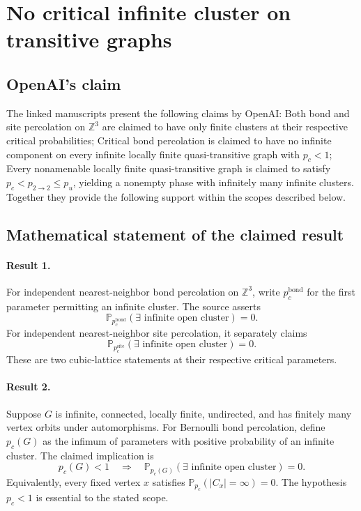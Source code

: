 \documentclass[11pt]{article}
\begin{document}
\section*{No critical infinite cluster on transitive graphs}

\subsection{OpenAI's claim}
The linked manuscripts present the following claims by OpenAI: Both bond and site percolation on $\mathbb Z^3$ are claimed to have only finite clusters at their respective critical probabilities; Critical bond percolation is claimed to have no infinite component on every infinite locally finite quasi-transitive graph with $p_c<1$; Every nonamenable locally finite quasi-transitive graph is claimed to satisfy $p_c<p_{2\to2}\leq p_u$, yielding a nonempty phase with infinitely many infinite clusters. Together they provide the following support within the scopes described below.

\subsection{Mathematical statement of the claimed result}
\paragraph{Result 1.} For independent nearest-neighbor bond percolation on \(\mathbb Z^3\), write \(p_c^{\mathrm{bond}}\) for the first parameter permitting an infinite cluster. The source asserts
\[
 \mathbb P_{p_c^{\mathrm{bond}}}(\exists\text{ infinite open cluster})=0.
\]
For independent nearest-neighbor site percolation, it separately claims
\[
 \mathbb P_{p_c^{\mathrm{site}}}(\exists\text{ infinite open cluster})=0.
\]
These are two cubic-lattice statements at their respective critical parameters.

\paragraph{Result 2.} Suppose \(G\) is infinite, connected, locally finite, undirected, and has finitely many vertex orbits under automorphisms. For Bernoulli bond percolation, define \(p_c(G)\) as the infimum of parameters with positive probability of an infinite cluster. The claimed implication is
\[
 p_c(G)<1\quad\Longrightarrow\quad
 \mathbb P_{p_c(G)}(\exists\text{ infinite open cluster})=0.
\]
Equivalently, every fixed vertex \(x\) satisfies \(\mathbb P_{p_c}(|C_x|=\infty)=0\). The hypothesis \(p_c<1\) is essential to the stated scope.
\end{document}
